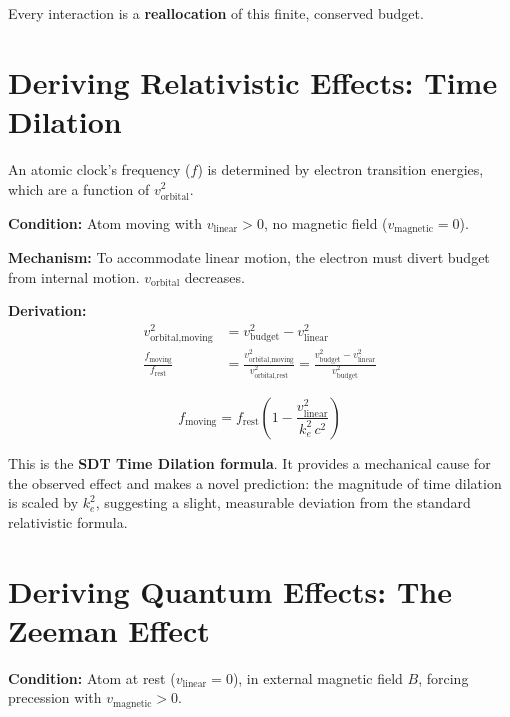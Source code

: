 Every interaction is a \textbf{reallocation} of this finite, conserved budget.


\section{Deriving Relativistic Effects: Time Dilation}

An atomic clock's frequency ($f$) is determined by electron transition energies, which are a function of $v_{\text{orbital}}^2$.

\textbf{Condition:} Atom moving with $v_{\text{linear}} > 0$, no magnetic field ($v_{\text{magnetic}} = 0$).

\textbf{Mechanism:} To accommodate linear motion, the electron must divert budget from internal motion.  $v_{\text{orbital}}$ decreases.

\textbf{Derivation:}
\begin{align}
  v_{\text{orbital,moving}}^2 &= v_{\text{budget}}^2 - v_{\text{linear}}^2 \\
  \frac{f_{\text{moving}}}{f_{\text{rest}}} &= \frac{v_{\text{orbital,moving}}^2}{v_{\text{orbital,rest}}^2}
    = \frac{v_{\text{budget}}^2 - v_{\text{linear}}^2}{v_{\text{budget}}^2}
\end{align}

\begin{equation}\label{eq:time-dilation}
  \boxed{f_{\text{moving}} = f_{\text{rest}} \left(1 - \frac{v_{\text{linear}}^2}{k_e^2\,c^2}\right)}
\end{equation}

This is the \textbf{SDT Time Dilation formula}.  It provides a mechanical cause for the observed effect and makes a novel prediction: the magnitude of time dilation is scaled by $k_e^2$, suggesting a slight, measurable deviation from the standard relativistic formula.


\section{Deriving Quantum Effects: The Zeeman Effect}

\textbf{Condition:} Atom at rest ($v_{\text{linear}} = 0$), in external magnetic field $B$, forcing precession with $v_{\text{magnetic}} > 0$.

